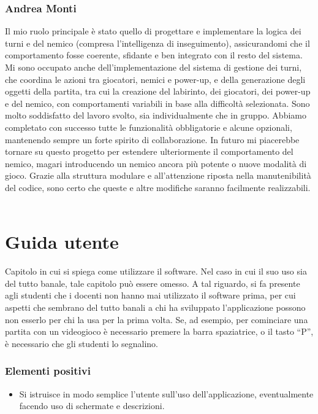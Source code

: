 \documentclass[a4paper,12pt]{report}
\begin{document}
\subsection{Andrea Monti}
Il mio ruolo principale è stato quello di progettare e implementare la logica dei turni e del nemico (compresa 
l’intelligenza di inseguimento), assicurandomi che il comportamento fosse coerente, sfidante e ben integrato con il 
resto del sistema. Mi sono occupato anche dell’implementazione del sistema di gestione dei turni, che coordina le azioni 
tra giocatori, nemici e power-up, e della generazione degli oggetti della partita, tra cui la creazione del labirinto, dei 
giocatori, dei power-up e del nemico, con comportamenti variabili in base alla difficoltà selezionata.
Sono molto soddisfatto del lavoro svolto, sia individualmente che in gruppo. Abbiamo completato con successo tutte le 
funzionalità obbligatorie e alcune opzionali, mantenendo sempre un forte spirito di collaborazione.
In futuro mi piacerebbe tornare su questo progetto per estendere ulteriormente il comportamento del nemico, 
magari introducendo un nemico ancora più potente o nuove modalità di gioco. Grazie alla struttura modulare e all’attenzione 
riposta nella manutenibilità del codice, sono certo che queste e altre modifiche saranno facilmente realizzabili.
\\
\\
\appendix

\chapter{Guida utente}

Capitolo in cui si spiega come utilizzare il software. Nel caso in cui il suo uso sia del tutto
banale, tale capitolo può essere omesso.
%
A tal riguardo, si fa presente agli studenti che i docenti non hanno mai utilizzato il software
prima, per cui aspetti che sembrano del tutto banali a chi ha sviluppato l'applicazione possono non
esserlo per chi la usa per la prima volta.
%
Se, ad esempio, per cominciare una partita con un videogioco è necessario premere la barra
spaziatrice, o il tasto ``P'', è necessario che gli studenti lo segnalino.

\subsection*{Elementi positivi}

\begin{itemize}
 \item Si istruisce in modo semplice l'utente sull'uso dell'applicazione, eventualmente facendo uso di schermate e descrizioni.
\end{itemize}
\end{document}
